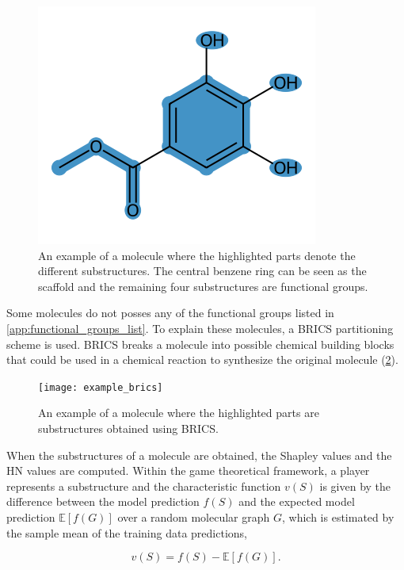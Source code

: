 \begin{figure}[ht]
    \centering
    \includegraphics[scale=0.45]{../../data/images/example_functional_groups.png}
    \caption{An example of a molecule where the highlighted parts denote the different substructures. 
    The central benzene ring can be seen as the scaffold and the remaining four substructures are 
functional groups.}
    \label{fig:example_functional_groups}
\end{figure}


Some molecules do not posses any of the functional groups listed in \cref{app:functional_groups_list}. 
To explain these molecules, a BRICS\cite{degen2008art} partitioning scheme is used. BRICS breaks a molecule into possible 
chemical building blocks that could be used in a chemical reaction to synthesize the original 
molecule (\cref{fig:example_brices}).


\begin{figure}[h]
    \centering
    \texttt{[image: example\_brics]}
    \caption{An example of a molecule where the highlighted parts are substructures obtained using BRICS.}
    \label{fig:example_brices}
\end{figure}

When the substructures of a molecule are obtained, the Shapley values and the HN values are 
computed. Within the game theoretical framework, a player represents a substructure and the 
characteristic function $v(S)$ is given by the difference between the model prediction $f(S)$ and 
the expected model prediction $\mathbb{E}[f(G)]$ over a random molecular graph $G$, which 
is estimated by the sample mean of the training data predictions,


\begin{equation}
    v(S) = f(S) - \mathbb{E}[f(G)].
\end{equation}



